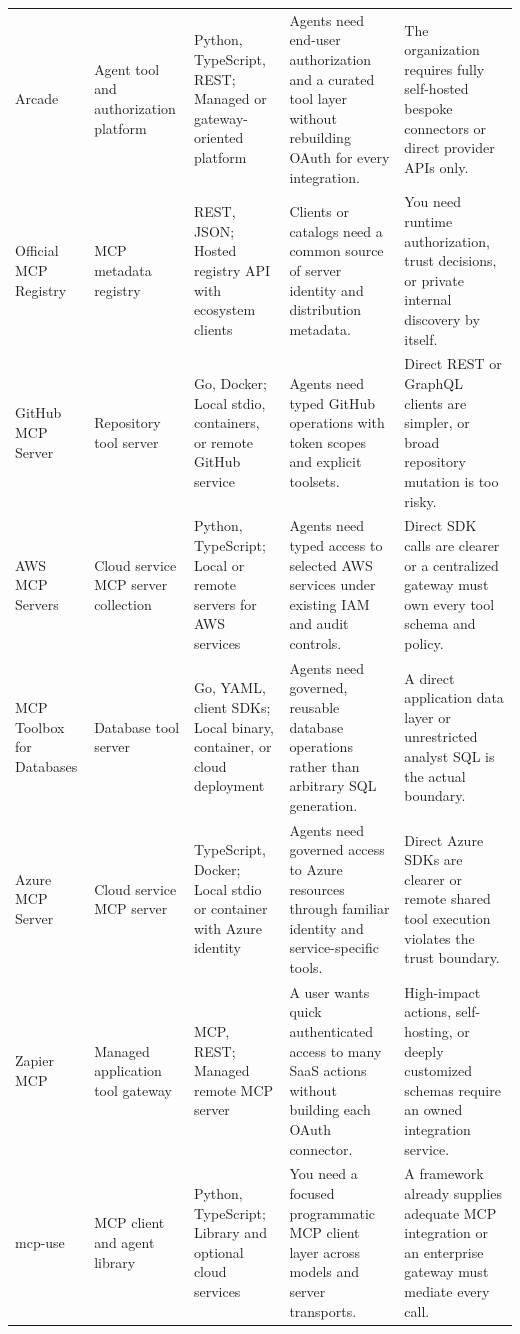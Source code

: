 \begin{longtable}{@{}p{20mm}p{22mm}p{26mm}p{46mm}p{46mm}@{}}
Arcade & Agent tool and authorization platform & Python, TypeScript, REST; Managed or gateway-oriented platform & Agents need end-user authorization and a curated tool layer without rebuilding OAuth for every integration. & The organization requires fully self-hosted bespoke connectors or direct provider APIs only.\\
Official MCP Registry & MCP metadata registry & REST, JSON; Hosted registry API with ecosystem clients & Clients or catalogs need a common source of server identity and distribution metadata. & You need runtime authorization, trust decisions, or private internal discovery by itself.\\
GitHub MCP Server & Repository tool server & Go, Docker; Local stdio, containers, or remote GitHub service & Agents need typed GitHub operations with token scopes and explicit toolsets. & Direct REST or GraphQL clients are simpler, or broad repository mutation is too risky.\\
AWS MCP Servers & Cloud service MCP server collection & Python, TypeScript; Local or remote servers for AWS services & Agents need typed access to selected AWS services under existing IAM and audit controls. & Direct SDK calls are clearer or a centralized gateway must own every tool schema and policy.\\
MCP Toolbox for Databases & Database tool server & Go, YAML, client SDKs; Local binary, container, or cloud deployment & Agents need governed, reusable database operations rather than arbitrary SQL generation. & A direct application data layer or unrestricted analyst SQL is the actual boundary.\\
Azure MCP Server & Cloud service MCP server & TypeScript, Docker; Local stdio or container with Azure identity & Agents need governed access to Azure resources through familiar identity and service-specific tools. & Direct Azure SDKs are clearer or remote shared tool execution violates the trust boundary.\\
Zapier MCP & Managed application tool gateway & MCP, REST; Managed remote MCP server & A user wants quick authenticated access to many SaaS actions without building each OAuth connector. & High-impact actions, self-hosting, or deeply customized schemas require an owned integration service.\\
mcp-use & MCP client and agent library & Python, TypeScript; Library and optional cloud services & You need a focused programmatic MCP client layer across models and server transports. & A framework already supplies adequate MCP integration or an enterprise gateway must mediate every call.\\
\bottomrule\end{longtable}
